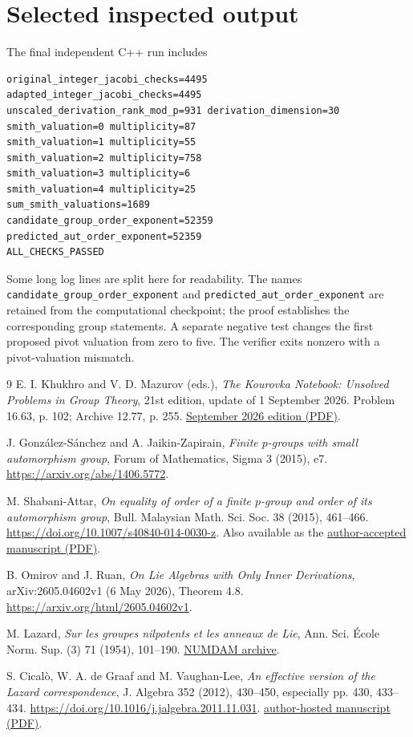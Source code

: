 \documentclass[11pt]{article}
\theoremstyle{definition}\newtheorem{definition}[theorem]{Definition}
\theoremstyle{remark}\newtheorem{remark}[theorem]{Remark}
\begin{document}
\clearpage
\appendix
\section{Selected inspected output}
The final independent C++ run includes
\begin{verbatim}
original_integer_jacobi_checks=4495
adapted_integer_jacobi_checks=4495
unscaled_derivation_rank_mod_p=931 derivation_dimension=30
smith_valuation=0 multiplicity=87
smith_valuation=1 multiplicity=55
smith_valuation=2 multiplicity=758
smith_valuation=3 multiplicity=6
smith_valuation=4 multiplicity=25
sum_smith_valuations=1689
candidate_group_order_exponent=52359
predicted_aut_order_exponent=52359
ALL_CHECKS_PASSED
\end{verbatim}
Some long log lines are split here for readability. The names
\texttt{candidate\_group\_order\_exponent} and
\texttt{predicted\_aut\_order\_exponent} are retained from the computational
checkpoint; the proof establishes the corresponding group statements.
A separate negative test changes the first proposed pivot valuation from
zero to five. The verifier exits nonzero with a pivot-valuation mismatch.

\begin{thebibliography}{9}
E. I. Khukhro and V. D. Mazurov (eds.),
\emph{The Kourovka Notebook: Unsolved Problems in Group Theory},
21st edition, update of 1 September 2026. Problem 16.63, p. 102;
Archive 12.77, p. 255.
\href{https://kourovkanotebookorg.wordpress.com/wp-content/uploads/2026/09/21tkt.pdf}{September 2026 edition (PDF)}.

J. Gonz\'alez-S\'anchez and A. Jaikin-Zapirain,
\emph{Finite $p$-groups with small automorphism group},
Forum of Mathematics, Sigma 3 (2015), e7.
\url{https://arxiv.org/abs/1406.5772}.

M. Shabani-Attar,
\emph{On equality of order of a finite $p$-group and order of its automorphism group},
Bull. Malaysian Math. Sci. Soc. 38 (2015), 461--466.
\url{https://doi.org/10.1007/s40840-014-0030-z}.
Also available as the
\href{https://math.usm.my/bulletin/pdf/acceptedpapers/2012-10-027-R1.pdf}{author-accepted manuscript (PDF)}.

B. Omirov and J. Ruan,
\emph{On Lie Algebras with Only Inner Derivations},
arXiv:2605.04602v1 (6 May 2026), Theorem 4.8.
\url{https://arxiv.org/html/2605.04602v1}.

M. Lazard,
\emph{Sur les groupes nilpotents et les anneaux de Lie},
Ann. Sci. \'Ecole Norm. Sup. (3) 71 (1954), 101--190.
\href{https://www.numdam.org/item/?id=ASENS_1954_3_71_2_101_0}{NUMDAM archive}.

S. Cical\`o, W. A. de Graaf and M. Vaughan-Lee,
\emph{An effective version of the Lazard correspondence},
J. Algebra 352 (2012), 430--450, especially pp. 430, 433--434.
\url{https://doi.org/10.1016/j.jalgebra.2011.11.031}.
\href{https://iris.unitn.it/retrieve/e3835192-3015-72ef-e053-3705fe0ad821/lazard.pdf}{author-hosted manuscript (PDF)}.
\end{thebibliography}
\end{document}
